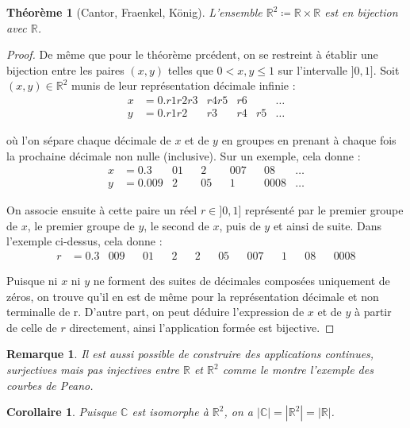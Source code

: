 \documentclass{article}
\theoremstyle{definition}
\theoremstyle{plain}
\newtheorem{theorem}[subsubsection]{Théorème}
\theoremstyle{plain}
\newtheorem{corollary}[subsubsection]{Corollaire}
\theoremstyle{plain}
\theoremstyle{plain}
\newtheorem{remark}[subsubsection]{Remarque}
\theoremstyle{plain}
\begin{document}
\begin{theorem}[Cantor, Fraenkel, König]
	L'ensemble \( \mathbb{R}^{2} \coloneqq \mathbb{R} \times \mathbb{R}\) est en bijection avec \( \mathbb{R} \). \cite{aigner2018proofs} 
\end{theorem}
\begin{proof}
	De même que pour le théorème prcédent, on se restreint à établir une bijection entre les paires \( (x,y) \) telles que \( 0 < x,y \le 1 \) sur l'intervalle \( ]0,1] \).
	Soit \( (x,y) \in \mathbb{R}^{2} \) munis de leur représentation décimale infinie :
	\begin{align*}
		x &= 0.r1r2r3 & r4r5 & r6 & &\ldots\\
		y &= 0.r1r2  & r3 & r4 & r5 &\ldots
	\end{align*}

	où l'on sépare chaque décimale de \( x \) et de \( y \) en groupes en prenant à chaque fois la prochaine décimale non nulle (inclusive). Sur un exemple, cela donne :
	\begin{align*}
		x &= 0.3 & 01 && 2 && 007 && 08 & \ldots\\
		y &= 0.009 & 2 && 05 && 1 && 0008 & \ldots
	\end{align*}

	On associe ensuite à cette paire un réel \( r \in ]0,1] \) représenté par le premier groupe de \( x \), le premier groupe de \( y \), le second de \( x \), puis de \( y \) et ainsi de suite.
	Dans l'exemple ci-dessus, cela donne :
	\begin{align*}
		r &= 0.3 & 009 && 01 && 2 && 2 && 05 && 007 && 1 && 08 && 0008
	\end{align*}

	Puisque ni \( x \) ni \( y \) ne forment des suites de décimales composées uniquement de zéros, on trouve qu'il en est de même pour la représentation décimale et non terminalle de r. 
	D'autre part, on peut déduire l'expression de \( x \) et de \( y \) à partir de celle de \( r \) directement, ainsi l'application formée est bijective.
\end{proof}

\begin{remark}
	Il est aussi possible de construire des applications continues, surjectives mais pas injectives entre \( \mathbb{R} \) et \( \mathbb{R}^{2} \) comme le montre l'exemple des courbes de Peano. \cite{peano1890curve}
\end{remark}

\begin{corollary}
	Puisque \( \mathbb{C} \) est isomorphe à \( \mathbb{R}^{2} \), on a \( |\mathbb{C}| = |\mathbb{R}^{2}| = |\mathbb{R}| \).
\end{corollary}
\end{document}
